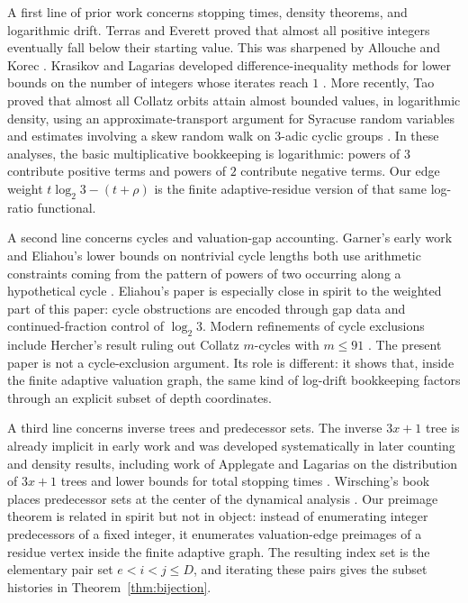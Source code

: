 \documentclass[11pt]{amsart}
\theoremstyle{definition}
\theoremstyle{remark}
\begin{document}
A first line of prior work concerns stopping times, density theorems, and logarithmic drift.  Terras \cite{Terras1976} and Everett \cite{Everett1977} proved that almost all positive integers eventually fall below their starting value.  This was sharpened by Allouche \cite{Allouche1979} and Korec \cite{Korec1994}.  Krasikov and Lagarias developed difference-inequality methods for lower bounds on the number of integers whose iterates reach $1$ \cite{KrasikovLagarias2003}.  More recently, Tao proved that almost all Collatz orbits attain almost bounded values, in logarithmic density, using an approximate-transport argument for Syracuse random variables and estimates involving a skew random walk on $3$-adic cyclic groups \cite{Tao2022}.  In these analyses, the basic multiplicative bookkeeping is logarithmic: powers of $3$ contribute positive terms and powers of $2$ contribute negative terms.  Our edge weight $t\log_2 3-(t+\rho)$ is the finite adaptive-residue version of that same log-ratio functional.

A second line concerns cycles and valuation-gap accounting.  Garner's early work and Eliahou's lower bounds on nontrivial cycle lengths both use arithmetic constraints coming from the pattern of powers of two occurring along a hypothetical cycle \cite{Garner1981,Eliahou1993}.  Eliahou's paper is especially close in spirit to the weighted part of this paper: cycle obstructions are encoded through gap data and continued-fraction control of $\log_2 3$.  Modern refinements of cycle exclusions include Hercher's result ruling out Collatz $m$-cycles with $m\le91$ \cite{Hercher2023}.  The present paper is not a cycle-exclusion argument.  Its role is different: it shows that, inside the finite adaptive valuation graph, the same kind of log-drift bookkeeping factors through an explicit subset of depth coordinates.

A third line concerns inverse trees and predecessor sets.  The inverse $3x+1$ tree is already implicit in early work and was developed systematically in later counting and density results, including work of Applegate and Lagarias on the distribution of $3x+1$ trees and lower bounds for total stopping times \cite{ApplegateLagarias1995,ApplegateLagarias2003}.  Wirsching's book places predecessor sets at the center of the dynamical analysis \cite{Wirsching1998}.  Our preimage theorem is related in spirit but not in object: instead of enumerating integer predecessors of a fixed integer, it enumerates valuation-edge preimages of a residue vertex inside the finite adaptive graph.  The resulting index set is the elementary pair set $e<i<j\le D$, and iterating these pairs gives the subset histories in Theorem~\ref{thm:bijection}.
\end{document}

